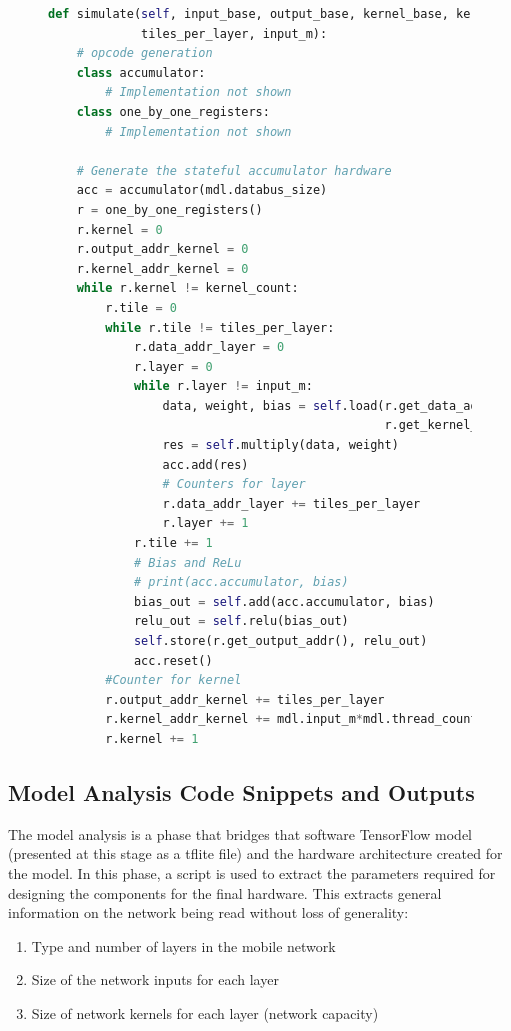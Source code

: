 \documentclass{uw-ece-wkrpt}
\begin{document}
\begin{figure}
\centering
\begin{lstlisting}[caption={Simulation of 1x1 convolution in functional model}, label=lst:1x1_sim, language=Python]
def simulate(self, input_base, output_base, kernel_base, kernel_count,
             tiles_per_layer, input_m):
    # opcode generation
    class accumulator:
        # Implementation not shown
    class one_by_one_registers:
        # Implementation not shown

    # Generate the stateful accumulator hardware
    acc = accumulator(mdl.databus_size)
    r = one_by_one_registers()
    r.kernel = 0
    r.output_addr_kernel = 0
    r.kernel_addr_kernel = 0
    while r.kernel != kernel_count:
        r.tile = 0
        while r.tile != tiles_per_layer:
            r.data_addr_layer = 0
            r.layer = 0
            while r.layer != input_m:
                data, weight, bias = self.load(r.get_data_addr(),
                                               r.get_kernel_addr())
                res = self.multiply(data, weight)
                acc.add(res)
                # Counters for layer
                r.data_addr_layer += tiles_per_layer
                r.layer += 1
            r.tile += 1
            # Bias and ReLu
            # print(acc.accumulator, bias)
            bias_out = self.add(acc.accumulator, bias)
            relu_out = self.relu(bias_out)
            self.store(r.get_output_addr(), relu_out)
            acc.reset()
        #Counter for kernel
        r.output_addr_kernel += tiles_per_layer
        r.kernel_addr_kernel += mdl.input_m*mdl.thread_count
        r.kernel += 1
\end{lstlisting}
\end{figure}

\subsection{Model Analysis Code Snippets and Outputs}

The model analysis is a phase that bridges that software TensorFlow model (presented at this stage as a tflite file) and the hardware architecture created for the model. In this phase, a script is used to extract the parameters required for designing the components for the final hardware. This extracts general information on the network being read without loss of generality:
\begin{enumerate}
\item Type and number of layers in the mobile network
\item Size of the network inputs for each layer
\item Size of network \glspl{kernel} for each layer (network capacity)
\end{enumerate}
\end{document}
